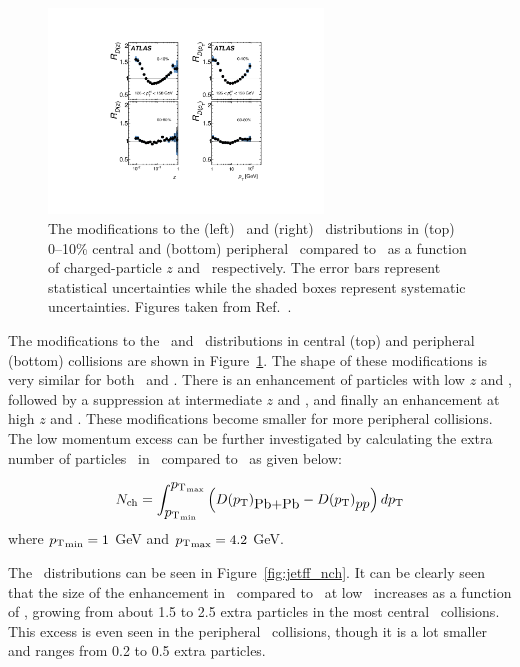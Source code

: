 \begin{figure}[htbp]
\begin{center}
\includegraphics[width=0.65\textwidth]{figures/jetMeasurements/jetff_rdz_rdpt}
\caption{The modifications to the (left) \Dz\ and (right) \Dpt\ distributions in (top) 0--10\% central and (bottom) peripheral \pbpb\ compared to \pp\ as a function of charged-particle $z$ and \pt\ respectively.
The error bars represent statistical uncertainties while the shaded boxes represent systematic uncertainties.
Figures taken from Ref.~\cite{PhysRevC.98.024908}.}
\label{fig:jetff_rdz_rdpt}
\end{center}
\end{figure}

The modifications to the \Dz\ and \Dpt\ distributions in central (top) and peripheral (bottom) collisions are shown in Figure~\ref{fig:jetff_rdz_rdpt}.
The shape of these modifications is very similar for both \Dz\ and \Dpt.
There is an enhancement of particles with low $z$ and \pt, followed by a suppression at intermediate $z$ and \pt, and finally an enhancement at high $z$ and \pt.
These modifications become smaller for more peripheral collisions.
The low momentum excess can be further investigated by calculating the extra number of particles \Nch\ in \pbpb\ compared to \pp\ as given below:

\begin{align}
\mbox{$N_{\mathrm{ch}}$} = \int^{\mbox{$p_{\mathrm{T}}$}_{\mathrm{max}}}_{\mbox{$p_{\mathrm{T}}$}_{\mathrm{min}}} \left( \mbox{$D(\mbox{$p_{\mathrm{T}}$})$}_{\mbox{Pb+Pb}} - \mbox{$D(\mbox{$p_{\mathrm{T}}$})$}_{\mbox{$pp$}} \right) d\mbox{$p_{\mathrm{T}}$}
\end{align}
where $\mbox{$p_{\mathrm{T}}$}_{\mathrm{min}} = 1$ GeV and $\mbox{$p_{\mathrm{T}}$}_{\mathrm{max}} = 4.2$ GeV.

The \Nch\ distributions can be seen in Figure~\ref{fig:jetff_nch}.
It can be clearly seen that the size of the enhancement in \pp\ compared to \pp\ at low \pt\ increases as a function of \ptjet, growing from about 1.5 to 2.5 extra particles in the most central \pbpb\ collisions.
This excess is even seen in the peripheral \pbpb\ collisions, though it is a lot smaller and ranges from 0.2 to 0.5 extra particles.



